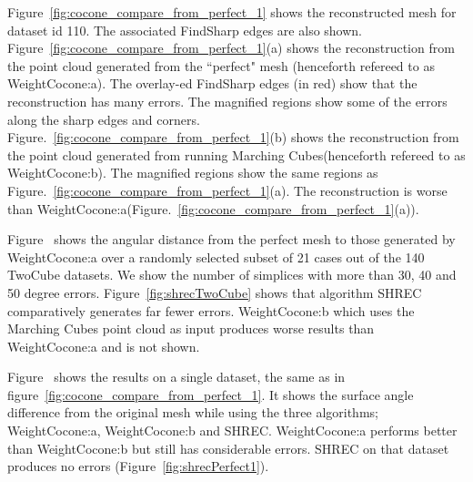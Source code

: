 Figure~\ref{fig:cocone_compare_from_perfect_1} shows the reconstructed mesh for dataset id 110. The associated FindSharp edges are also shown. Figure~\ref{fig:cocone_compare_from_perfect_1}(a) shows the reconstruction from the point cloud generated from the ``perfect" mesh (henceforth refereed to as WeightCocone:a). The overlay-ed FindSharp edges (in red) show that the reconstruction has many errors. The magnified regions show some of the errors along the sharp edges and corners. Figure.~\ref{fig:cocone_compare_from_perfect_1}(b) shows the reconstruction from the point cloud generated from running Marching Cubes(henceforth refereed to as WeightCocone:b). The magnified regions show the same regions as Figure.~\ref{fig:cocone_compare_from_perfect_1}(a). The reconstruction is worse than WeightCocone:a(Figure.~\ref{fig:cocone_compare_from_perfect_1}(a)).

Figure~\protect{} shows the angular distance from the perfect mesh to those generated by WeightCocone:a over a randomly selected subset of 21 cases out of the 140 TwoCube datasets. We show the number of simplices with more than 30, 40 and 50 degree errors. Figure~\ref{fig:shrecTwoCube} shows that algorithm SHREC comparatively generates far fewer errors. WeightCocone:b which uses the Marching Cubes point cloud as input produces worse results than WeightCocone:a and is not shown.

Figure~\protect{} shows the results on a single dataset, the same as in figure~\ref{fig:cocone_compare_from_perfect_1}. It shows the surface angle difference from the original mesh while using the three algorithms; WeightCocone:a, WeightCocone:b and SHREC. WeightCocone:a performs better than WeightCocone:b but still has considerable errors. SHREC on that dataset produces no errors (Figure~\ref{fig:shrecPerfect1}). 

